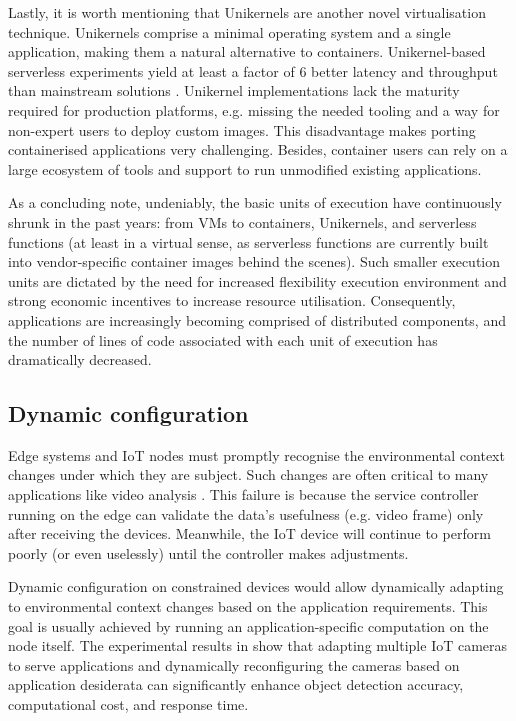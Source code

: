Lastly, it is worth mentioning that Unikernels \cite{madhavapeddy2013unikernels} are another novel virtualisation technique. Unikernels comprise a minimal operating system and a single application, making them a natural alternative to containers. Unikernel-based serverless experiments yield at least a factor of 6 better latency and throughput than mainstream solutions \cite{koller2017will}. Unikernel implementations lack the maturity required for production platforms, e.g. missing the needed tooling and a way for non-expert users to deploy custom images. This disadvantage makes porting containerised applications very challenging. Besides, container users can rely on a large ecosystem of tools and support to run unmodified existing applications.

As a concluding note, undeniably, the basic units of execution have continuously shrunk in the past years: from VMs to containers, Unikernels, and serverless functions (at least in a virtual sense, as serverless functions are currently built into vendor-specific container images behind the scenes). Such smaller execution units are dictated by the need for increased flexibility execution environment and strong economic incentives to increase resource utilisation. Consequently, applications are increasingly becoming comprised of distributed components, and the number of lines of code associated with each unit of execution has dramatically decreased.

\subsection{Dynamic configuration}

Edge systems and IoT nodes must promptly recognise the environmental context changes under which they are subject. Such changes are often critical to many applications like video analysis \cite{jang2018application}. This failure is because the service controller running on the edge can validate the data's usefulness (e.g. video frame) only after receiving the devices. Meanwhile, the IoT device will continue to perform poorly (or even uselessly) until the controller makes adjustments.

Dynamic configuration on constrained devices would allow dynamically adapting to environmental context changes based on the application requirements. This goal is usually achieved by running an application-specific computation on the node itself. The experimental results in \cite{jang2018application} show that adapting multiple IoT cameras to serve applications and dynamically reconfiguring the cameras based on application desiderata can significantly enhance object detection accuracy, computational cost, and response time.

